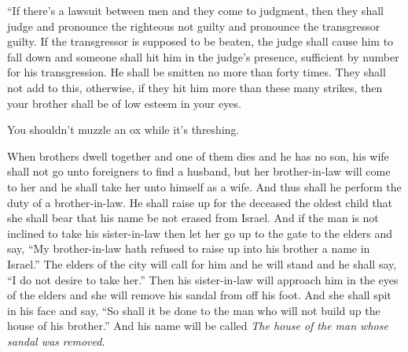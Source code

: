 
\begin{inparaenum}
     ``If there's a lawsuit between men and they come to judgment, then they shall judge and pronounce the righteous not guilty and pronounce the transgressor guilty.%
     If the transgressor is supposed to be beaten, the judge shall cause him to fall down and someone shall hit him in the judge's presence, sufficient by number for his transgression.%
     He shall be smitten no more than forty times. They shall not add to this, otherwise, if they hit him more than these many strikes, then your brother shall be of low esteem in your eyes.%
    
     You shouldn't muzzle an ox while it's threshing.%
    
     When brothers dwell together and one of them dies and he has no son, his wife shall not go unto foreigners to find a husband, but her brother-in-law will come to her and he shall take her unto himself as a wife. And thus shall he perform the duty of a brother-in-law.%
     He shall raise up for the deceased the oldest child that she shall bear that his name be not erased from Israel.%
     And if the man is not inclined to take his sister-in-law then let her go up to the gate to the elders and say, ``My brother-in-law hath refused to raise up into his brother a name in Israel.''%
     The elders of the city will call for him and he will stand and he shall say, ``I do not desire to take her.''%
     Then his sister-in-law will approach him in the eyes of the elders and she will remove his sandal from off his foot. And she shall spit in his face and say, ``So shall it be done to the man who will not build up the house of his brother.''%
     And his name will be called \textit{The house of the man whose sandal was removed}.%
    

\end{inparaenum}
